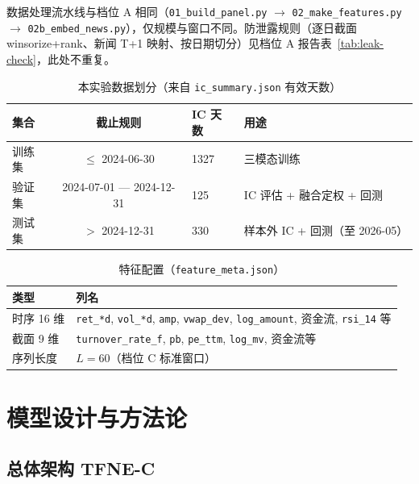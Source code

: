 \documentclass[UTF8,a4paper,12pt]{ctexart}
\begin{document}
数据处理流水线与档位 A 相同（\texttt{01\_build\_panel.py} $\to$ \texttt{02\_make\_features.py} $\to$ \texttt{02b\_embed\_news.py}），仅规模与窗口不同。防泄露规则（逐日截面 winsorize+rank、新闻 T+1 映射、按日期切分）见档位 A 报告表~\ref{tab:leak-check}，此处不重复。

\begin{table}[H]
\centering
\caption{本实验数据划分（来自 \texttt{ic\_summary.json} 有效天数）}
\label{tab:split-c}
\begin{tabular}{lcll}
\toprule
\textbf{集合} & \textbf{截止规则} & \textbf{IC 天数} & \textbf{用途} \\
\midrule
训练集 & $\le$ 2024-06-30 & 1327 & 三模态训练 \\
验证集 & 2024-07-01 --- 2024-12-31 & 125 & IC 评估 + 融合定权 + 回测 \\
测试集 & $>$ 2024-12-31 & 330 & 样本外 IC + 回测（至 2026-05） \\
\bottomrule
\end{tabular}
\end{table}

\begin{table}[H]
\centering
\caption{特征配置（\texttt{feature\_meta.json}）}
\label{tab:feat}
\begin{tabular}{ll}
\toprule
\textbf{类型} & \textbf{列名} \\
\midrule
时序 16 维 & \texttt{ret\_*d}, \texttt{vol\_*d}, \texttt{amp}, \texttt{vwap\_dev}, \texttt{log\_amount}, 资金流, \texttt{rsi\_14} 等 \\
截面 9 维  & \texttt{turnover\_rate\_f}, \texttt{pb}, \texttt{pe\_ttm}, \texttt{log\_mv}, 资金流等 \\
序列长度   & $L=60$（档位 C 标准窗口） \\
\bottomrule
\end{tabular}
\end{table}

\section{模型设计与方法论}

\subsection{总体架构 TFNE-C}
\end{document}

